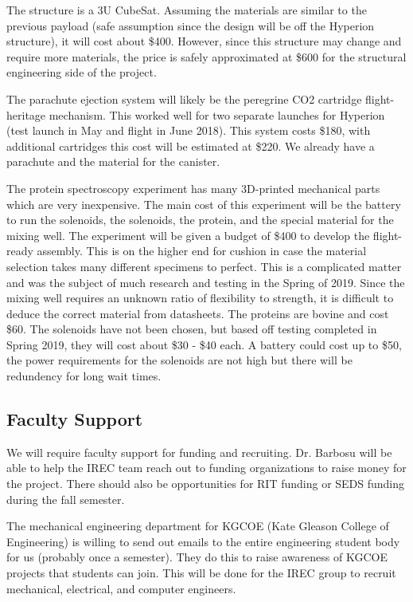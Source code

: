 \documentclass[conference]{IEEEtran} %
\begin{document}
The structure is a 3U CubeSat. Assuming the materials are similar to the previous payload (safe assumption since the design will be off the Hyperion structure), it will cost about \$400. 
However, since this structure may change and require more materials, the price is safely approximated at \$600 for the structural engineering side of the project. 

The parachute ejection system will likely be the peregrine CO2 cartridge flight-heritage mechanism. This worked well for two separate launches for Hyperion (test launch in May and flight in June 2018). 
This system costs \$180, with additional cartridges this cost will be estimated at \$220. We already have a parachute and the material for the canister. 

The protein spectroscopy experiment has many 3D-printed mechanical parts which are very inexpensive. The main cost of this experiment will be the battery to run the solenoids, the solenoids, 
the protein, and the special material for the mixing well. The experiment will be given a budget of \$400 to develop the flight-ready assembly. This is on the higher end for cushion in case 
the material selection takes many different specimens to perfect. This is a complicated matter and was the subject of much research and testing in the Spring of 2019. Since the mixing well 
requires an unknown ratio of flexibility to strength, it is difficult to deduce the correct material from datasheets. The proteins are bovine and cost \$60. The solenoids have not been 
chosen, but based off testing completed in Spring 2019, they will cost about \$30 - \$40 each. A battery could cost up to \$50, the power requirements for the solenoids are not high but there 
will be redundency for long wait times. 

\subsection{Faculty Support}
We will require faculty support for funding and recruiting. Dr. Barbosu will be able to help the IREC team reach out to funding organizations to raise money for the project. There should also be 
opportunities for RIT funding or SEDS funding during the fall semester. 

The mechanical engineering department for KGCOE (Kate Gleason College of Engineering) is willing to send out emails to the entire engineering student body for us (probably once a semester). They 
do this to raise awareness of KGCOE projects that students can join. This will be done for the IREC group to recruit mechanical, electrical, and computer engineers. 
\end{document}
